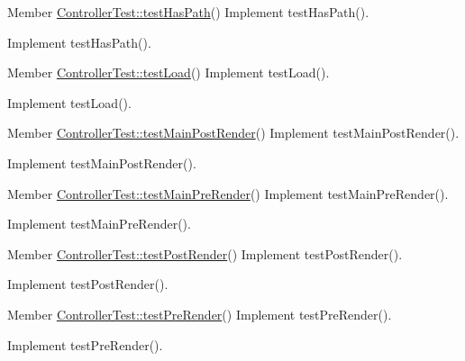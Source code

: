 \begin{DoxyDescription}
\item[Member \hyperlink{class_controller_test_ad342a101d96328075917c8ded4d109a4}{ControllerTest::testHasPath}() ]Implement testHasPath().

Implement testHasPath().
\end{DoxyDescription}

\label{todo__todo000014}
\hypertarget{todo__todo000014}{}
 
\begin{DoxyDescription}
\item[Member \hyperlink{class_controller_test_a9772b11dffd28551c31884820d2ca5a0}{ControllerTest::testLoad}() ]Implement testLoad().

Implement testLoad().
\end{DoxyDescription}

\label{todo__todo000021}
\hypertarget{todo__todo000021}{}
 
\begin{DoxyDescription}
\item[Member \hyperlink{class_controller_test_a92fe7f1df3870f770d2a4d8e65994755}{ControllerTest::testMainPostRender}() ]Implement testMainPostRender().

Implement testMainPostRender().
\end{DoxyDescription}

\label{todo__todo000020}
\hypertarget{todo__todo000020}{}
 
\begin{DoxyDescription}
\item[Member \hyperlink{class_controller_test_adebbb5338f993c808bf7d67d691cf1a9}{ControllerTest::testMainPreRender}() ]Implement testMainPreRender().

Implement testMainPreRender().
\end{DoxyDescription}

\label{todo__todo000023}
\hypertarget{todo__todo000023}{}
 
\begin{DoxyDescription}
\item[Member \hyperlink{class_controller_test_ac6ebb6172efb2ecd0b15f9744e6ef9bf}{ControllerTest::testPostRender}() ]Implement testPostRender().

Implement testPostRender().
\end{DoxyDescription}

\label{todo__todo000022}
\hypertarget{todo__todo000022}{}
 
\begin{DoxyDescription}
\item[Member \hyperlink{class_controller_test_ac6794ab53872a13d8d18dcac6d64c46e}{ControllerTest::testPreRender}() ]Implement testPreRender().

Implement testPreRender().
\end{DoxyDescription}


